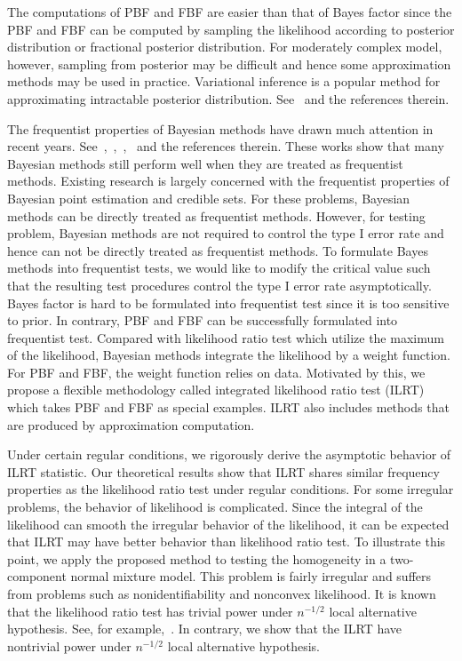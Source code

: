 \documentclass[11pt]{article}
\theoremstyle{plain}
\theoremstyle{definition}
\theoremstyle{remark}
\begin{document}
The computations of PBF and FBF are easier than that of Bayes factor since the PBF and FBF can be computed by sampling the likelihood according to posterior distribution or fractional posterior distribution.
For moderately complex model, however, sampling from posterior may be difficult and hence some approximation methods may be used in practice.
Variational inference is a popular method for approximating intractable posterior distribution.
See~\cite{blei2017} and the references therein.

The frequentist properties of Bayesian methods have drawn much attention in recent years.
See~\cite{ghosal2000},~\cite{Shen2001Rates},~\cite{vaart2007convergence},~\cite{Kleijn2012The} and the references therein.
These works show that many Bayesian methods still perform well when they are treated as frequentist methods.
Existing research is largely concerned with the frequentist properties of Bayesian point estimation and credible sets.
For these problems, Bayesian methods can be directly treated as frequentist methods.
However, for testing problem, Bayesian methods are not required to control the type I error rate and hence can not be directly treated as frequentist methods.
To formulate Bayes methods into frequentist tests, we would like to modify the critical value such that the resulting test procedures control the type I error rate asymptotically.
Bayes factor is hard to be formulated into frequentist test since it is too sensitive to prior.
In contrary, PBF and FBF can be successfully formulated into frequentist test.
Compared with likelihood ratio test which utilize the maximum of the likelihood, Bayesian methods integrate the likelihood by a weight function.
For PBF and FBF, the weight function relies on data.
Motivated by this, we propose a flexible methodology called integrated likelihood ratio test (ILRT) which takes PBF and FBF as special examples.
ILRT also includes methods that are produced by approximation computation.

Under certain regular conditions, we rigorously derive the asymptotic behavior of ILRT statistic.
Our theoretical results show that ILRT shares similar frequency properties as the likelihood ratio test under regular conditions.
For some irregular problems, the behavior of likelihood is complicated.
Since the integral of the likelihood can smooth the irregular behavior of the likelihood, it can be expected that ILRT may have better behavior than likelihood ratio test.
To illustrate this point,
we apply the proposed method to testing the homogeneity in a two-component normal mixture model.
This problem is fairly irregular and suffers from problems such as nonidentifiability and nonconvex likelihood.
It is known that the likelihood ratio test has trivial power under $n^{-1/2}$ local alternative hypothesis. See, for example,~\cite{HALL2005158}.
In contrary, we show that the ILRT have nontrivial power under $n^{-1/2}$ local alternative hypothesis.
\end{document}
